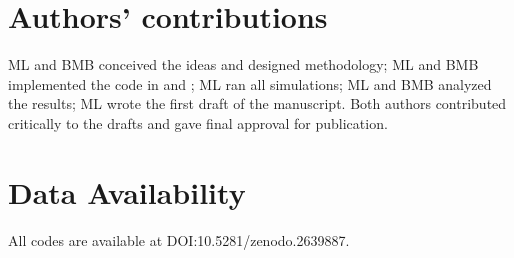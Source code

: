 \documentclass[12pt]{article}
\begin{document}
\section*{Authors’ contributions}

ML and BMB conceived the ideas and designed methodology; ML and BMB implemented the code in  and ; ML ran all simulations; ML and BMB analyzed the results; ML wrote the first draft of the manuscript. Both authors contributed critically to the drafts and gave final approval for publication.

\section*{Data Availability}

All codes are available at DOI:10.5281/zenodo.2639887.

% 
\end{document}
